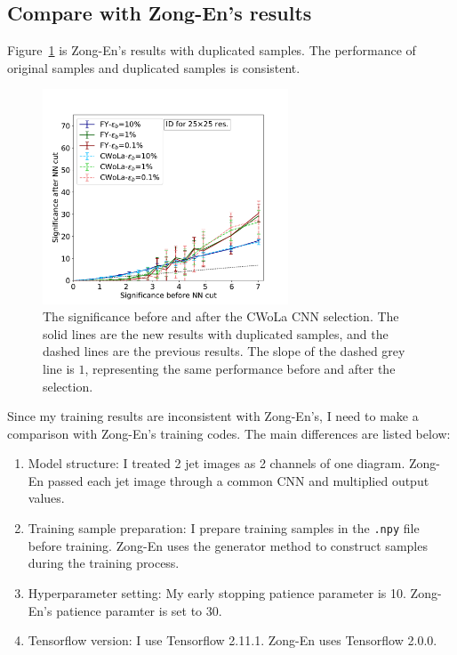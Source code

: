 \documentclass[12pt]{article}
\begin{document}
    \subsection{Compare with Zong-En's results}%
    \label{sub:compare_with_zong_en_s_results}
        Figure~\ref{fig:sensitivity_improvement_bkg_eff_copy_1_ZN_testing} is Zong-En's results with duplicated samples. The performance of original samples and duplicated samples is consistent.
        \begin{figure}[htpb]
            \centering
            \includegraphics[width=0.65\textwidth]{HVmodel_sensitivity_improvement_bkg_eff_copy_1_ZN_testing.pdf}
            \caption{The significance before and after the CWoLa CNN selection. The solid lines are the new results with duplicated samples, and the dashed lines are the previous results. The slope of the dashed grey line is $1$, representing the same performance before and after the selection.}
            \label{fig:sensitivity_improvement_bkg_eff_copy_1_ZN_testing}
        \end{figure}

        Since my training results are inconsistent with Zong-En's, I need to make a comparison with Zong-En's training codes. The main differences are listed below:
        \begin{enumerate}
            \item Model structure: I treated 2 jet images as 2 channels of one diagram. Zong-En passed each jet image through a common CNN and multiplied output values.
            \item Training sample preparation: I prepare training samples in the \verb|.npy| file before training. Zong-En uses the generator method to construct samples during the training process.
            \item Hyperparameter setting: My early stopping patience parameter is 10. Zong-En's patience paramter is set to 30.
            \item Tensorflow version: I use Tensorflow 2.11.1. Zong-En uses Tensorflow 2.0.0.
        \end{enumerate}
\end{document}
